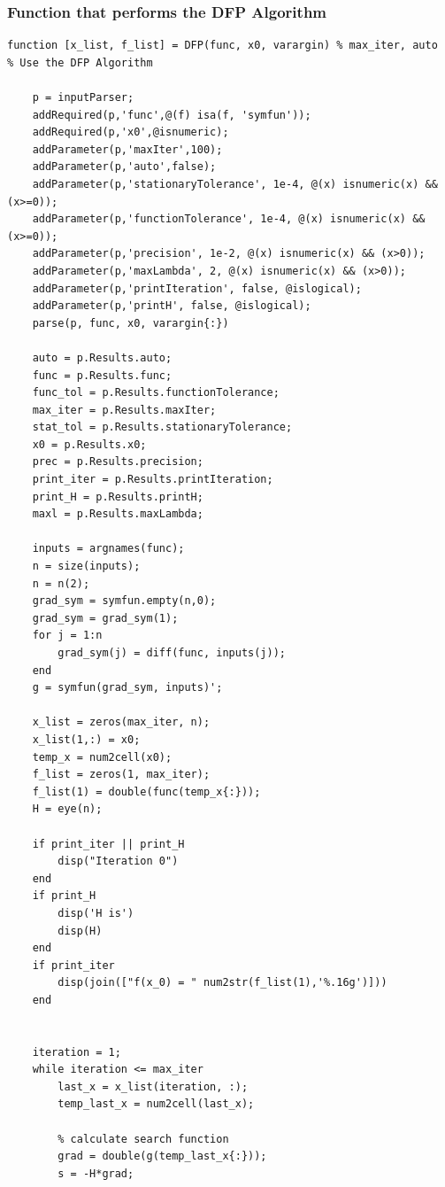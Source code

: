 \documentclass[11pt]{article} %
\begin{document}
\subsubsection*{Function that performs the DFP Algorithm}
\begin{lstlisting}
function [x_list, f_list] = DFP(func, x0, varargin) % max_iter, auto
% Use the DFP Algorithm

    p = inputParser;
    addRequired(p,'func',@(f) isa(f, 'symfun'));
    addRequired(p,'x0',@isnumeric);
    addParameter(p,'maxIter',100);
    addParameter(p,'auto',false);
    addParameter(p,'stationaryTolerance', 1e-4, @(x) isnumeric(x) && (x>=0));
    addParameter(p,'functionTolerance', 1e-4, @(x) isnumeric(x) && (x>=0));
    addParameter(p,'precision', 1e-2, @(x) isnumeric(x) && (x>0));
    addParameter(p,'maxLambda', 2, @(x) isnumeric(x) && (x>0));
    addParameter(p,'printIteration', false, @islogical);
    addParameter(p,'printH', false, @islogical);
    parse(p, func, x0, varargin{:})
    
    auto = p.Results.auto;
    func = p.Results.func;
    func_tol = p.Results.functionTolerance;
    max_iter = p.Results.maxIter;
    stat_tol = p.Results.stationaryTolerance;
    x0 = p.Results.x0;
    prec = p.Results.precision;
    print_iter = p.Results.printIteration;
    print_H = p.Results.printH;
    maxl = p.Results.maxLambda;

    inputs = argnames(func);
    n = size(inputs);
    n = n(2);
    grad_sym = symfun.empty(n,0);
    grad_sym = grad_sym(1);
    for j = 1:n
        grad_sym(j) = diff(func, inputs(j));
    end
    g = symfun(grad_sym, inputs)';
    
    x_list = zeros(max_iter, n);
    x_list(1,:) = x0;
    temp_x = num2cell(x0);
    f_list = zeros(1, max_iter);
    f_list(1) = double(func(temp_x{:}));
    H = eye(n);
    
    if print_iter || print_H
        disp("Iteration 0")
    end
    if print_H
        disp('H is')
        disp(H)
    end
    if print_iter
        disp(join(["f(x_0) = " num2str(f_list(1),'%.16g')]))
    end
    
    
    iteration = 1;
    while iteration <= max_iter
        last_x = x_list(iteration, :);
        temp_last_x = num2cell(last_x);
        
        % calculate search function
        grad = double(g(temp_last_x{:}));
        s = -H*grad;
        

\end{lstlisting}
\end{document}
